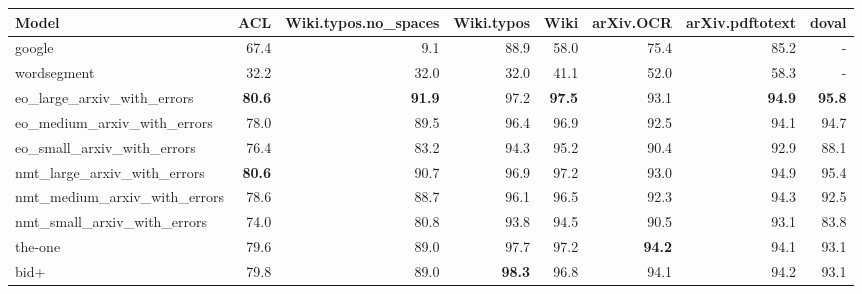 \begin{tabular}{lrrrrrrr} \hline
Model & ACL & Wiki.typos.no\_spaces & Wiki.typos & Wiki & arXiv.OCR & arXiv.pdftotext & doval \\ \hline
google & 67.4 & 9.1 & 88.9 & 58.0 & 75.4 & 85.2 & - \\ 
wordsegment & 32.2 & 32.0 & 32.0 & 41.1 & 52.0 & 58.3 & - \\ \hline
eo\_large\_arxiv\_with\_errors & \textbf{80.6} & \textbf{91.9} & 97.2 & \textbf{97.5} & 93.1 & \textbf{94.9} & \textbf{95.8} \\ 
eo\_medium\_arxiv\_with\_errors & 78.0 & 89.5 & 96.4 & 96.9 & 92.5 & 94.1 & 94.7 \\ 
eo\_small\_arxiv\_with\_errors & 76.4 & 83.2 & 94.3 & 95.2 & 90.4 & 92.9 & 88.1 \\ \hline
nmt\_large\_arxiv\_with\_errors & \textbf{80.6} & 90.7 & 96.9 & 97.2 & 93.0 & 94.9 & 95.4 \\ 
nmt\_medium\_arxiv\_with\_errors & 78.6 & 88.7 & 96.1 & 96.5 & 92.3 & 94.3 & 92.5 \\ 
nmt\_small\_arxiv\_with\_errors & 74.0 & 80.8 & 93.8 & 94.5 & 90.5 & 93.1 & 83.8 \\ \hline
the-one & 79.6 & 89.0 & 97.7 & 97.2 & \textbf{94.2} & 94.1 & 93.1 \\ 
bid+ & 79.8 & 89.0 & \textbf{98.3} & 96.8 & 94.1 & 94.2 & 93.1 \\ \hline
\end{tabular}